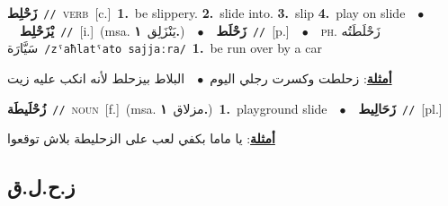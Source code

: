 \documentclass[10pt,a4paper,twoside]{article} %
\begin{document}
\begin{multicols}{2}
{{{{{{{{{\setlength\topsep{0pt}\textbf{\foreignlanguage{arabic}{زَحْلِط}}\ {\color{gray}\texttt{//}\color{black}}\ \textsc{verb}\ [c.]\ \textbf{1.}~be slippery.  \textbf{2.}~slide into.  \textbf{3.}~slip  \textbf{4.}~play on slide\ \ $\bullet$\ \ \setlength\topsep{0pt}\textbf{\foreignlanguage{arabic}{يْزَحْلِط}}\ {\color{gray}\texttt{//}\color{black}}\ [i.]\ \color{gray}(msa. \foreignlanguage{arabic}{يَنْزَلِق}~\foreignlanguage{arabic}{\textbf{١.}})\color{black}\ \ $\bullet$\ \ \setlength\topsep{0pt}\textbf{\foreignlanguage{arabic}{زَحْلَط}}\ {\color{gray}\texttt{//}\color{black}}\ [p.]\ \ $\bullet$\ \ \textsc{ph.} \color{gray} \foreignlanguage{arabic}{زَحْلَطَتُه سَيَّارَة}\color{black}\ {\color{gray}\texttt{/{\sffamily zˤaħlatˤato sajjaːra}/}\color{black}}\ \textbf{1.}~be run over by a car\  \begin{flushright}\color{gray}\foreignlanguage{arabic}{\textbf{\underline{\foreignlanguage{arabic}{أمثلة}}}: زحلطت وكسرت رجلي اليوم\ $\bullet$\ \  البلاط بيزحلط لأنه انكب عليه زيت}\end{flushright}\color{black}} \vspace{2mm}

{\setlength\topsep{0pt}\textbf{\foreignlanguage{arabic}{زُحْلَيطَة}}\ {\color{gray}\texttt{//}\color{black}}\ \textsc{noun}\ [f.]\ \color{gray}(msa. \foreignlanguage{arabic}{مزلاق}~\foreignlanguage{arabic}{\textbf{١.}})\color{black}\ \textbf{1.}~playground slide\ \ $\bullet$\ \ \setlength\topsep{0pt}\textbf{\foreignlanguage{arabic}{زَحَالِيط}}\ {\color{gray}\texttt{//}\color{black}}\ [pl.]\  \begin{flushright}\color{gray}\foreignlanguage{arabic}{\textbf{\underline{\foreignlanguage{arabic}{أمثلة}}}: يا ماما بكفي لعب على الزحليطة بلاش توقعوا}\end{flushright}\color{black}} \vspace{2mm}

\vspace{-3mm}
\subsection*{\color{blue}\foreignlanguage{arabic}{ز.ح.ل.ق}\color{blue}{}} 

}}}}}}}}
\end{multicols}
\end{document}
